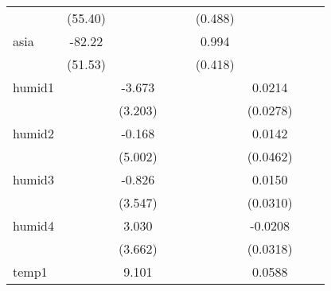 {\begin{tabular}{l*{8}{c}}
            &     (55.40)         &                     &                     &                     &     (0.488)         &                     &                     &                     \\
[1em]
asia        &      -82.22         &                     &                     &                     &       0.994\sym{**} &                     &                     &                     \\
            &     (51.53)         &                     &                     &                     &     (0.418)         &                     &                     &                     \\
[1em]
humid1      &                     &      -3.673         &                     &                     &                     &      0.0214         &                     &                     \\
            &                     &     (3.203)         &                     &                     &                     &    (0.0278)         &                     &                     \\
[1em]
humid2      &                     &      -0.168         &                     &                     &                     &      0.0142         &                     &                     \\
            &                     &     (5.002)         &                     &                     &                     &    (0.0462)         &                     &                     \\
[1em]
humid3      &                     &      -0.826         &                     &                     &                     &      0.0150         &                     &                     \\
            &                     &     (3.547)         &                     &                     &                     &    (0.0310)         &                     &                     \\
[1em]
humid4      &                     &       3.030         &                     &                     &                     &     -0.0208         &                     &                     \\
            &                     &     (3.662)         &                     &                     &                     &    (0.0318)         &                     &                     \\
[1em]
temp1       &                     &       9.101         &                     &                     &                     &      0.0588         &                     &                     \\

\end{tabular}}
